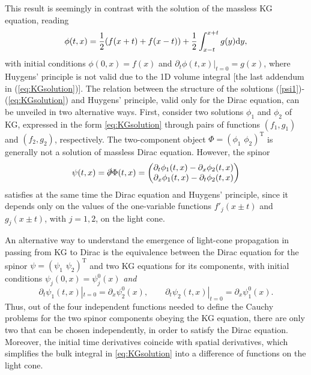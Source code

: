 This result is seemingly in contrast with the solution of the massless KG equation, reading
\begin{equation}
\label{eq:KGsolution}
\phi(t,x) = \frac{1}{2}(f(x+t) + f(x-t)) + \frac{1}{2}\int^{x+t}_{x-t} g(y)\mathrm{d} y,
\end{equation}
with initial conditions $\phi(0,x) = f(x)$ and $\partial_t\phi(t,x)|_{t=0} = g(x)$, where Huygens' principle is not valid due to the 1D volume integral [the last addendum in (\ref{eq:KGsolution})]. The relation between the structure of the solutions (\ref{psi1})-(\ref{eq:KGsolution}) and Huygens' principle, valid only for the Dirac equation, can be unveiled in two alternative ways. First, consider two solutions $\phi_1$ and $\phi_2$ of KG, expressed in the form \eqref{eq:KGsolution} through pairs of functions $(f_1,g_1)$ and $(f_2,g_2)$, respectively. The two-component object $\Phi=(\phi_1\,\,\phi_2)^{\mathrm{T}}$ is generally not a solution of massless Dirac equation. However, the spinor 
\begin{equation}
\psi(t,x)=\slashed{\partial}\Phi(t,x) = \left( \begin{matrix} \partial_t \phi_1(t,x)- \partial_x \phi_2(t,x) \\ \partial_x \phi_1(t,x) - \partial_t \phi_2(t,x)                
\end{matrix} \right)
\end{equation}
satisfies at the same time the Dirac equation and Huygens' principle, since it depends only on the values of the one-variable functions $f'_j(x\pm t)$ and $g_j(x\pm t)$, with $j=1,2$, on the light cone. 

An alternative way to understand the emergence of light-cone propagation in passing from KG to Dirac is the equivalence between the Dirac equation for the spinor $\psi=(\psi_1\,\,\psi_2)^{\mathrm{T}}$ and two KG equations for its components, with initial conditions $\psi_j(0,x)=\psi_j^0(x)$ \emph{and}
\begin{equation}
\partial_t \psi_1(t,x)|_{t=0} = \partial_x \psi_2^0(x), \qquad \partial_t \psi_2(t,x)|_{t=0} = \partial_x \psi_1^0(x) .
\end{equation}
Thus, out of the four independent functions needed to define the Cauchy problems for the two spinor components obeying the KG equation, there are only two that can be chosen independently, in order to satisfy the Dirac equation. Moreover, the initial time derivatives coincide with spatial derivatives, which simplifies the bulk integral in \eqref{eq:KGsolution} into a difference of functions on the light cone. 




